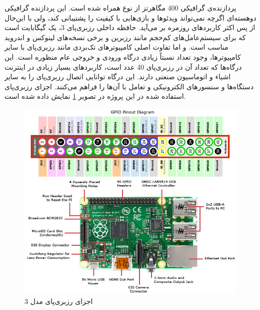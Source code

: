 پردازنده‌ی گرافیکی 400 مگاهرتز از نوع  همراه شده است. این پردازنده گرافیکی دوهسته‌ای اگرچه نمی‌تواند ویدئوها و بازی‌هایی با کیفیت  را پشتیبانی کند، ولی با این‌حال از پس اکثر کاربردهای روزمره بر می‌آید. حافظه داخلی رزبری‌پای 3، یک گیگابایت است که برای سیستم‌عامل‌های کم‌حجم مانند رزبرین و برخی نسخه‌های لینوکس و اندروید مناسب است. 
و اما تفاوت اصلی کامپیوترهای تک‌بردی مانند رزبری‌پای با سایر کامپیوترها، وجود تعداد نسبتاً زیادی درگاه ورودی و خروجی عام منظوره است. این درگاه‌ها که تعداد آن در رزبری‌پای 40 عدد است، کاربردهای بسیار زیادی در اینترنت اشیاء و اتوماسیون صنعتی دارند. این درگاه توانایی اتصال رزبری‌پای را به سایر دستگاه‌ها و سنسورهای الکترونیکی و تعامل با آن‌ها را فراهم می‌کنند. اجزای رزبری‌پای استفاده شده در این پروژه در تصویر \ref{raspberry} نمایش داده شده است.

\begin{figure}[t!]
    \centering
    \includegraphics[scale=0.60]{figures/raspberry.jpg}
    \caption{اجزای رزبری‌پای مدل 3}
    \label{raspberry}
\end{figure}

